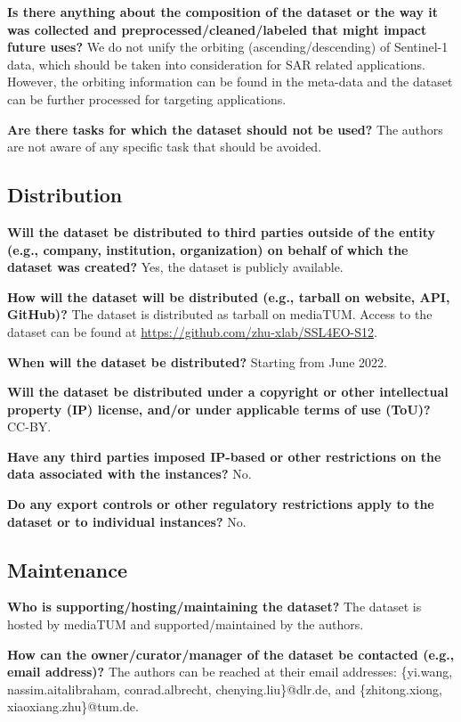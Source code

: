 \documentclass[lettersize,journal]{IEEEtran}
\begin{document}
\textbf{Is there anything about the composition of the dataset or the way it was collected and preprocessed/cleaned/labeled that might impact future uses?} We do not unify the orbiting (ascending/descending) of Sentinel-1 data, which should be taken into consideration for SAR related applications. However, the orbiting information can be found in the meta-data and the dataset can be further processed for targeting applications.

\textbf{Are there tasks for which the dataset should not be used?} The authors are not aware of any specific task that should be avoided.

\subsection{Distribution}

\textbf{Will the dataset be distributed to third parties outside of the entity (e.g., company, institution,
organization) on behalf of which the dataset was created?} Yes, the dataset is publicly available.


\textbf{How will the dataset will be distributed (e.g., tarball on website, API, GitHub)?} The dataset is distributed as tarball on mediaTUM. Access to the dataset can be found at \url{https://github.com/zhu-xlab/SSL4EO-S12}.

\textbf{When will the dataset be distributed?} Starting from June 2022.

\textbf{Will the dataset be distributed under a copyright or other intellectual property (IP) license, and/or under applicable terms of use (ToU)? } CC-BY.

\textbf{Have any third parties imposed IP-based or other restrictions on the data associated with the instances?} No.

\textbf{Do any export controls or other regulatory restrictions apply to the dataset or to individual
instances?} No.

\subsection{Maintenance} 

\textbf{Who is supporting/hosting/maintaining the dataset?} The dataset is hosted by mediaTUM and supported/maintained by the authors.

\textbf{How can the owner/curator/manager of the dataset be contacted (e.g., email address)?} The authors can be reached at their email addresses: \{yi.wang, nassim.aitalibraham, conrad.albrecht, chenying.liu\}@dlr.de, and \{zhitong.xiong, xiaoxiang.zhu\}@tum.de.
\end{document}
